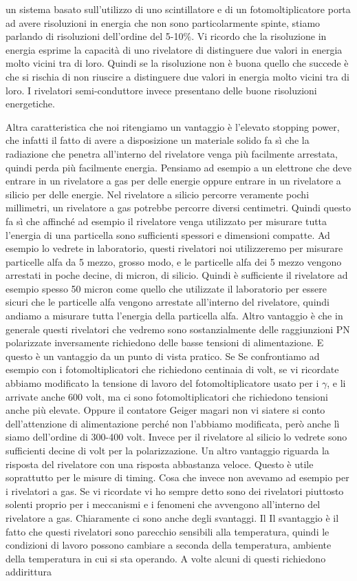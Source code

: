 un sistema basato sull'utilizzo di uno scintillatore e di un fotomoltiplicatore porta ad avere risoluzioni in energia che non sono particolarmente spinte, stiamo parlando di risoluzioni dell'ordine del 5-10\%. Vi ricordo che la risoluzione in energia esprime la capacità di uno rivelatore di distinguere due valori in energia molto vicini tra di loro. Quindi se la risoluzione non è buona quello che succede è che si rischia di non riuscire a distinguere due valori in energia molto vicini tra di loro. I rivelatori semi-conduttore invece presentano delle buone risoluzioni energetiche.

Altra caratteristica che noi ritengiamo un vantaggio è l'elevato stopping power, che infatti il fatto di avere a disposizione un materiale solido fa sì che la radiazione che penetra all'interno del rivelatore venga più facilmente arrestata, quindi perda più facilmente energia. Pensiamo ad esempio a un elettrone che deve entrare in un rivelatore a gas per delle energie oppure entrare in un rivelatore a silicio per delle energie. Nel rivelatore a silicio percorre veramente pochi millimetri, un rivelatore a gas potrebbe percorre diversi centimetri. Quindi questo fa sì che affinché ad esempio il rivelatore venga utilizzato per misurare tutta l'energia di una particella sono sufficienti spessori e dimensioni compatte. Ad esempio lo vedrete in laboratorio, questi rivelatori noi utilizzeremo per misurare particelle alfa da 5 mezzo, grosso modo, e le particelle alfa dei 5 mezzo vengono arrestati in poche decine, di micron, di silicio. Quindi è sufficiente il rivelatore ad esempio spesso 50 micron come quello che utilizzate il laboratorio per essere sicuri che le particelle alfa vengono arrestate all'interno del rivelatore, quindi andiamo a misurare tutta l'energia della particella alfa. Altro vantaggio è che in generale questi rivelatori che vedremo sono sostanzialmente delle raggiunzioni PN polarizzate inversamente richiedono delle basse tensioni di alimentazione. E questo è un vantaggio da un punto di vista pratico. Se Se confrontiamo ad esempio con i fotomoltiplicatori che richiedono centinaia di volt, se vi ricordate abbiamo modificato la tensione di lavoro del fotomoltiplicatore usato per i $\gamma$, e li arrivate anche 600 volt, ma ci sono fotomoltiplicatori che richiedono tensioni anche più elevate. Oppure il contatore Geiger magari non vi siatere si conto dell'attenzione di alimentazione perché non l'abbiamo modificata, però anche lì siamo dell'ordine di 300-400 volt. Invece per il rivelatore al silicio lo vedrete sono sufficienti decine di volt per la polarizzazione. Un altro vantaggio riguarda la risposta del rivelatore con una risposta abbastanza veloce. Questo è utile soprattutto per le misure di timing. Cosa che invece non avevamo ad esempio per i rivelatori a gas. Se vi ricordate vi ho sempre detto sono dei rivelatori piuttosto solenti proprio per i meccanismi e i fenomeni che avvengono all'interno del rivelatore a gas. Chiaramente ci sono anche degli svantaggi. Il Il svantaggio è il fatto che questi rivelatori sono parecchio sensibili alla temperatura, quindi le condizioni di lavoro possono cambiare a seconda della temperatura, ambiente della temperatura in cui si sta operando. A volte alcuni di questi richiedono addirittura 